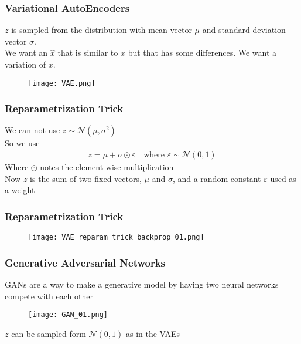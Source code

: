 \documentclass{beamer}
\begin{document}
\begin{frame}
\frametitle{Variational AutoEncoders}
$z$ is sampled from  the distribution with mean vector $\mu$ and standard deviation vector $\sigma$.
\\
We want an $\hat x$ that is similar to $x$ but that has some differences.
We want a variation of $x$.
\begin{figure}[ht]
  \texttt{[image: VAE.png]}
\end{figure}
\end{frame}

\begin{frame}
\frametitle{Reparametrization Trick}
We can not use $z \sim \mathcal{N}(\mu, \sigma ^ 2)$
\\
So we use
\begin{align*}
  z = \mu + \sigma \odot \varepsilon
  \quad \textrm{where $\varepsilon  \sim \mathcal{N}(0,1)$}
\end{align*}
Where $\odot$ notes the element-wise multiplication
\\
Now $z$ is the sum of two fixed vectors, $\mu$ and $\sigma$, and a random constant $\varepsilon$ used as a weight

\end{frame}

\begin{frame}
\frametitle{Reparametrization Trick}
\begin{figure}[ht]
  \texttt{[image: VAE\_reparam\_trick\_backprop\_01.png]}
\end{figure}
\end{frame}

\begin{frame}
\frametitle{Generative Adversarial Networks}
GANs are a way to make a generative model by having two neural networks compete with each other
\begin{figure}[ht]
  \texttt{[image: GAN\_01.png]}
\end{figure}
$z$ can be sampled form $\mathcal{N}(0,1)$ as in the VAEs
\end{frame}
\end{document}
